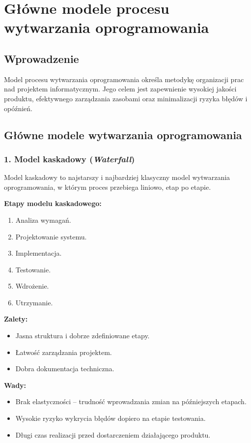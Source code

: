 \section{Główne modele procesu wytwarzania oprogramowania}

\subsection{Wprowadzenie}
Model procesu wytwarzania oprogramowania określa metodykę organizacji prac nad projektem informatycznym. Jego celem jest zapewnienie wysokiej jakości produktu, efektywnego zarządzania zasobami oraz minimalizacji ryzyka błędów i opóźnień.

\subsection{Główne modele wytwarzania oprogramowania}

\subsubsection{1. Model kaskadowy (\textit{Waterfall})}
Model kaskadowy to najstarszy i najbardziej klasyczny model wytwarzania oprogramowania, w którym proces przebiega liniowo, etap po etapie.

\textbf{Etapy modelu kaskadowego:}
\begin{enumerate}
    \item Analiza wymagań.
    \item Projektowanie systemu.
    \item Implementacja.
    \item Testowanie.
    \item Wdrożenie.
    \item Utrzymanie.
\end{enumerate}

\textbf{Zalety:}
\begin{itemize}
    \item Jasna struktura i dobrze zdefiniowane etapy.
    \item Łatwość zarządzania projektem.
    \item Dobra dokumentacja techniczna.
\end{itemize}

\textbf{Wady:}
\begin{itemize}
    \item Brak elastyczności – trudność wprowadzania zmian na późniejszych etapach.
    \item Wysokie ryzyko wykrycia błędów dopiero na etapie testowania.
    \item Długi czas realizacji przed dostarczeniem działającego produktu.
\end{itemize}

